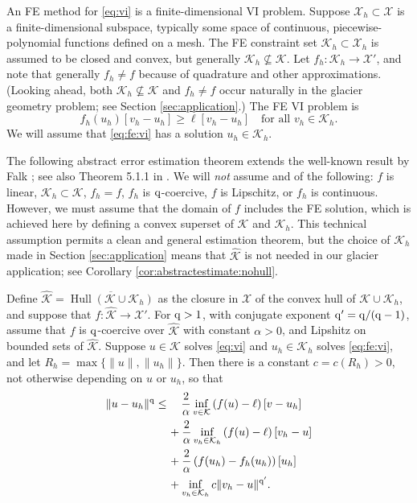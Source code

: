 \documentclass[hidelinks,onefignum,onetabnum,final]{siamart220329}  %
\newcommand{\cK}{\mathcal{K}}
\newcommand{\cX}{\mathcal{X}}
\newcommand{\hcK}{\widehat{\cK}}
\newcommand{\qq}{{\text{\textnormal{q}}}}
\DeclareMathOperator*{\Hull}{Hull}
\begin{document}
An FE method for \eqref{eq:vi} is a finite-dimensional VI problem.  Suppose $\cX_h \subset \cX$ is a finite-dimensional subspace, typically some space of continuous, piecewise-polynomial functions defined on a mesh.  The FE constraint set $\cK_h\subset \cX_h$ is assumed to be closed and convex, but generally $\cK_h \nsubseteq \cK$.  Let $f_h:\cK_h\to\cX'$, and note that generally $f_h\ne f$ because of quadrature and other approximations.  (Looking ahead, both $\cK_h \nsubseteq \cK$ and $f_h\ne f$ occur naturally in the glacier geometry problem; see Section \ref{sec:application}.)  The FE VI problem is
\begin{equation}
f_h(u_h)[v_h-u_h] \ge \ell[v_h-u_h] \quad \text{for all } v_h\in \cK_h. \label{eq:fe:vi}
\end{equation}
We will assume that \eqref{eq:fe:vi} has a solution $u_h\in\cK_h$.

The following abstract error estimation theorem extends the well-known result by Falk \cite{Falk1974}; see also Theorem 5.1.1 in \cite{Ciarlet2002}.  We will \emph{not} assume and of the following: $f$ is linear, $\cK_h \subset \cK$, $f_h=f$, $f_h$ is $\qq$-coercive, $f$ is Lipschitz, or $f_h$ is continuous.  However, we must assume that the domain of $f$ includes the FE solution, which is achieved here by defining a convex superset of $\cK$ and $\cK_h$.  This technical assumption permits a clean and general estimation theorem, but the choice of $\cK_h$ made in Section \ref{sec:application} means that $\hcK$ is not needed in our glacier application; see Corollary \ref{cor:abstractestimate:nohull}.

\begin{theorem} \label{thm:abstractestimate}  Define $\hcK = \overline{\Hull{(\cK \cup \cK_h)}}$ as the closure in $\cX$ of the convex hull of $\cK \cup \cK_h$, and suppose that $f:\hcK \to \cX'$.  For $\qq>1$, with conjugate exponent $\qq'=\qq/(\qq-1)$, assume that $f$ is $\qq$-coercive over $\hcK$ with constant $\alpha>0$, and Lipshitz on bounded sets of $\hcK$.  Suppose $u\in\cK$ solves \eqref{eq:vi} and $u_h\in\cK_h$ solves \eqref{eq:fe:vi}, and let $R_h=\max\{\|u\|,\|u_h\|\}$.  Then there is a constant $c=c(R_h)>0$, not otherwise depending on $u$ or $u_h$, so that
\begin{align}
\|u-u_h\|^\qq &\le \quad \frac{2}{\alpha} \inf_{v\in\cK} \left(f(u)-\ell\right)[v-u_h] \label{eq:abstractestimate} \\
   &\quad\, + \frac{2}{\alpha} \inf_{v_h\in\cK_h} \left(f(u)-\ell\right)[v_h-u] \notag \\
   &\quad\, + \frac{2}{\alpha} \left(f(u_h)-f_h(u_h)\right)[u_h] \notag \\
   &\quad\, + \inf_{v_h\in\cK_h} c \|v_h - u\|^{\qq'}. \notag
\end{align}
\end{theorem}
\end{document}
